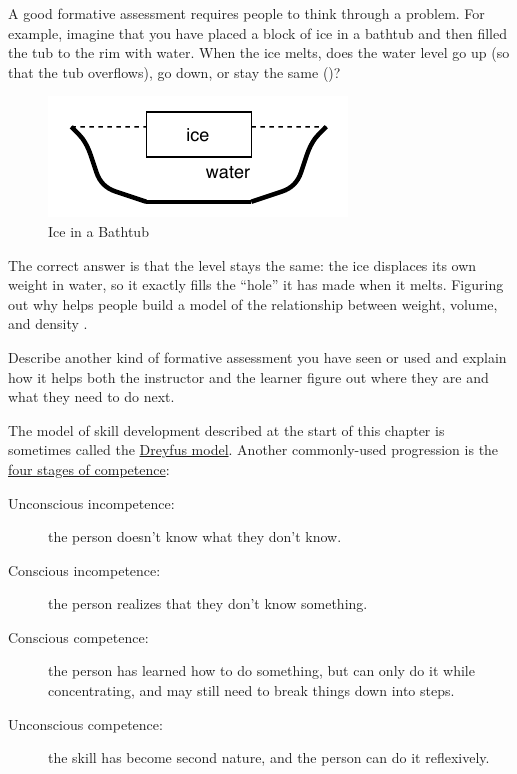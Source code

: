A good formative assessment requires people to think through a
problem.  For example, imagine that you have placed a block of ice in
a bathtub and then filled the tub to the rim with water.  When the ice
melts, does the water level go up (so that the tub overflows), go
down, or stay the same ()?

\begin{figure}
\centering
\includegraphics{../docs/fig/bathtub.pdf}
\caption{Ice in a Bathtub}
\label{f:models-bathtub}
\end{figure}

The correct answer is that the level stays the same: the ice displaces
its own weight in water, so it exactly fills the ``hole'' it has made
when it melts. Figuring out why helps people build a model of the
relationship between weight, volume, and density \cite{Epst2002}.

Describe another kind of formative assessment you have seen or used and
explain how it helps both the instructor and the learner figure out
where they are and what they need to do next.


The model of skill development described at the start of this chapter
is sometimes called the
\href{https://en.wikipedia.org/wiki/Dreyfus_model\_of\_skill\_acquisition}{Dreyfus
  model}.  Another commonly-used progression is the
\href{https://en.wikipedia.org/wiki/Four_stages_of_competence}{four
  stages of competence}:

\begin{description}

  \item[Unconscious incompetence:] the person doesn't know what they
    don't know.

  \item[Conscious incompetence:] the person realizes that they don't
    know something.

  \item[Conscious competence:] the person has learned how to do
    something, but can only do it while concentrating, and may still
    need to break things down into steps.

  \item[Unconscious competence:] the skill has become second nature,
    and the person can do it reflexively.

\end{description}

